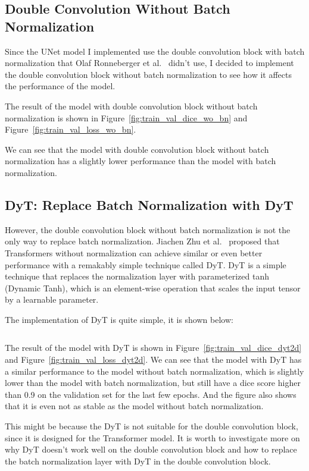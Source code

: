 \subsection{Double Convolution Without Batch Normalization}

Since the UNet model I implemented use the double convolution block with batch normalization that Olaf Ronneberger et al.~\cite{UNet} didn't use, I decided to implement the double convolution block without batch normalization to see how it affects the performance of the model.

The result of the model with double convolution block without batch normalization is shown in Figure~\ref{fig:train_val_dice_wo_bn} and Figure~\ref{fig:train_val_loss_wo_bn}.


We can see that the model with double convolution block without batch normalization has a slightly lower performance than the model with batch normalization.

\subsection{DyT: Replace Batch Normalization with DyT}
\label{sec:dyt}

However, the double convolution block without batch normalization is not the only way to replace batch normalization.
Jiachen Zhu et al.~\cite{DyT} proposed that Transformers without normalization can achieve similar or even better performance with a remakably simple technique called DyT.
DyT is a simple technique that replaces the normalization layer with parameterized tanh (Dynamic Tanh), which is an element-wise operation that scales the input tensor by a learnable parameter.

The implementation of DyT is quite simple, it is shown below:

\inputminted[firstline=5, lastline=20]{python}{../src/models/common.py}

The result of the model with DyT is shown in Figure~\ref{fig:train_val_dice_dyt2d} and Figure~\ref{fig:train_val_loss_dyt2d}.
We can see that the model with DyT has a similar performance to the model without batch normalization, which is slightly lower than the model with batch normalization, but still have a dice score higher than 0.9 on the validation set for the last few epochs.
And the figure also shows that it is even not as stable as the model without batch normalization.

This might be because the DyT is not suitable for the double convolution block, since it is designed for the Transformer model.
It is worth to investigate more on why DyT doesn't work well on the double convolution block and how to replace the batch normalization layer with DyT in the double convolution block.

